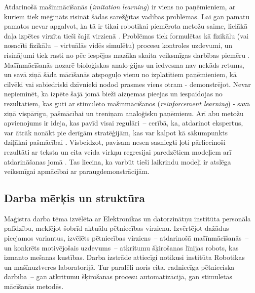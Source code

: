 \documentclass[12pt, a4paper]{article}
\numberwithin{equation}{section} %
\begin{document}
Atdarinošā mašīnmācīšanās (\textit{imitation learning}) ir viens no paņēmieniem, ar kuriem tiek mēģināts risināt šādas sarežģītas vadības problēmas. Lai gan pamatu pamatos nevar apgalvot, ka tā ir tikai robotikai piemērota metožu saime, lielākā daļa izpētes virzīta tieši šajā virzienā \cite{attia2018global}. Problēmas tiek formulētas kā fizikālu (vai nosacīti fizikālu~-- virtuālās vidēs simulētu) procesu kontroles uzdevumi, un risinājumi tiek rasti no pēc iespējas mazāka skaita veiksmīgas darbības piemēru \cite{attia2018global}. Mašīnmācīšanās nozarē bioloģiskas analo-ģijas un iedvesma nav nekāds retums, un savā ziņā šāda mācīšanās  atspoguļo vienu no izplatītiem paņēmieniem, kā cilvēki vai sabiedriski dzīvnieki nodod prasmes viens otram - demonstrējot. Nevar nepieminēt, ka izpēte šajā jomā bieži aizņemas pieejas un iespaidojas no rezultātiem, kas gūti ar stimulēto mašīnmācīšanos (\textit{reinforcement learning}) - savā ziņā vispārīgu, pašmācībai un treniņam analoģisku paņēmienu. Arī abu metožu apvienojums ir ideja, kas pavīd visai regulāri~-- cerībā, ka, atdarinot ekspertus, var ātrāk nonākt pie derīgām stratēģijām, kas var kalpot kā sākumpunkts dziļākai pašmācībai \cite{hester2018deep}. Visbeidzot, pavisam nesen sasniegti ļoti pārliecinoši rezultāti ar teksta un cita veida virkņu regresijai paredzētiem modeļiem arī atdarināšanas jomā \cite{reed2022generalist}. Tas liecina, ka varbūt tieši laikrindu modeļi ir atslēga veiksmīgai apmācībai ar paraugdemonstrācijām.

\subsection*{Darba mērķis un struktūra} %

Maģistra darba tēma izvēlēta ar Elektronikas un datorzinātņu institūta personāla palīdzību, meklējot šobrīd aktuālu pētniecības virzienu. Izvērtējot dažādus pieejamos variantus, izvēlēts pētniecības virziens~-- atdarinošā mašīnmācīšanās~-- un konkrēts motivējošais uzdevums~-- atkritumu šķirošanas līnijas robots, kas izmanto mešanas kustības. Darba izstrāde attiecīgi notikusi institūta Robotikas un mašīnuztveres laboratorijā. Tur paralēli noris cita, radniecīga pētnieciska darbība~-- gan atkritumu šķirošanas procesu automatizācijā, gan stimulētās mācīšanās metodēs. 
\end{document}
